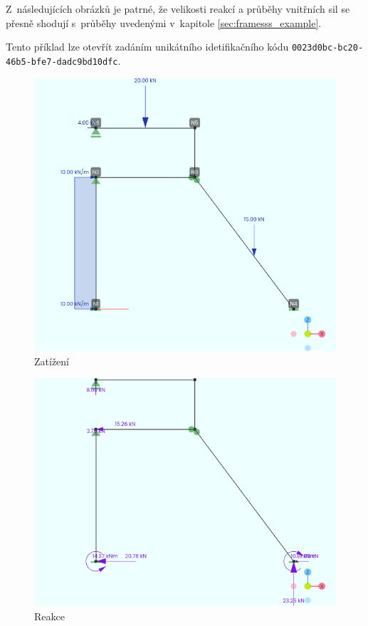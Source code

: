 Z~následujících obrázků je patrné, že velikosti reakcí a průběhy vnitřních sil se přesně shodují s~průběhy uvedenými v~kapitole \ref{sec:framesss_example}.

Tento příklad lze otevřít zadáním unikátního idetifikačního kódu \texttt{0023d0bc-bc20-46b5-bfe7-dadc9bd10dfc}.

\begin{figure}[H]
    \includegraphics{assets/figures/wbapp/example/loads.png}
    \caption{Zatížení}
    \label{fig:wb_app_example_loads}
\end{figure}

\begin{figure}[H]
    \includegraphics{assets/figures/wbapp/example/reactions.png}
    \caption{Reakce}
    \label{fig:wb_app_example_reactions}
\end{figure}

